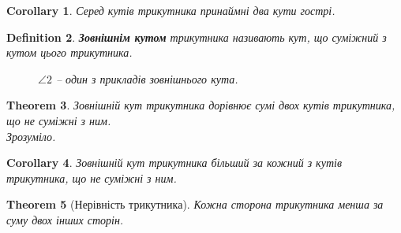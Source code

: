 \documentclass[a4paper, 10pt]{article}
\theoremstyle{theoremdd}
\newtheorem{theorem}{Theorem}[subsection]
\theoremstyle{theoremdd}
\theoremstyle{theoremdd}
\newtheorem{definition}[theorem]{Definition}
\theoremstyle{theoremdd}
\theoremstyle{theoremdd}
\theoremstyle{theoremdd}
\theoremstyle{theoremdd}
\theoremstyle{theoremdd}
\theoremstyle{theoremdd}
\newtheorem{corollary}[theorem]{Corollary}
\begin{document}
\begin{corollary}
Серед кутів трикутника принаймні два кути гострі.
\end{corollary}

\begin{definition}
\textbf{Зовнішнім кутом} трикутника називають кут, що суміжний з кутом цього трикутника.
\begin{figure}[H]
\centering
{}
\caption*{$\angle 2$ -- один з прикладів зовнішнього кута.}
\end{figure}
\end{definition}

\begin{theorem}
Зовнішній кут трикутника дорівнює сумі двох кутів трикутника, що не суміжні з ним.\\
\textit{Зрозуміло.}
\end{theorem}

\begin{corollary}
\label{outer_angle_bigger_than_not_adjacent}
Зовнішній кут трикутника більший за кожний з кутів трикутника, що не суміжні з ним.
\end{corollary}

\begin{theorem}[Нерівність трикутника]
Кожна сторона трикутника менша за суму двох інших сторін.
\end{theorem}
\end{document}
